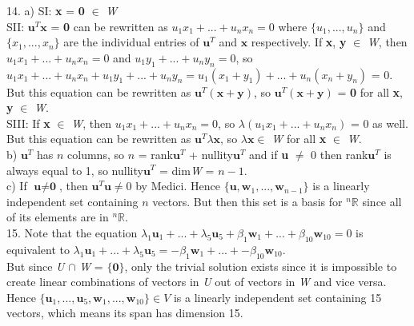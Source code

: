 \documentclass{article}
\begin{document}
    14. a) SI: \textbf{x} = \textbf{0} $\in$ \textit{W}\\
    SII: $\textbf{u}^T\textbf{x}$ = \textbf{0} can be rewritten as $\textit{u}_1\textit{x}_1 + ... + \textit{u}_n\textit{x}_n = 0$ where $\{\textit{u}_1, ..., \textit{u}_n\}$ and $\{\textit{x}_1, ..., \textit{x}_n\}$ are the individual entries of $\textbf{u}^T$ and $\textbf{x}$ respectively. If \textbf{x}, \textbf{y} $\in$ \textit{W}, then $\textit{u}_1\textit{x}_1 + ... + \textit{u}_n\textit{x}_n = 0$ and $\textit{u}_1\textit{y}_1 + ... + \textit{u}_n\textit{y}_n = 0$, so $\textit{u}_1\textit{x}_1 + ... + \textit{u}_n\textit{x}_n + \textit{u}_1\textit{y}_1 + ... + \textit{u}_n\textit{y}_n = \textit{u}_1(\textit{x}_1 +\textit{y}_1) + ... + \textit{u}_n(\textit{x}_n + \textit{y}_n)$ = 0. But this equation can be rewritten as $\textbf{u}^T(\textbf{x} + \textbf{y})$, so $\textbf{u}^T(\textbf{x} + \textbf{y})$ = \textbf{0} for all \textbf{x}, \textbf{y} $\in$ \textit{W}.\\
    SIII: If \textbf{x} $\in$ \textit{W}, then $\textit{u}_1\textit{x}_1 + ... + \textit{u}_n\textit{x}_n = 0$, so $\lambda(\textit{u}_1\textit{x}_1 + ... + \textit{u}_n\textit{x}_n)$ = 0 as well. But this equation can be rewritten as $\textbf{u}^T\lambda\textbf{x}$, so $\lambda\textbf{x} \in$ \textit{W} for all \textbf{x} $\in$ \textit{W}.\\
    b) $\textbf{u}^T$ has $n$ columns, so  $n$ = rank$\textbf{u}^T$ + nullity$\textbf{u}^T$ and if \textbf{u} $\neq$ 0 then rank$\textbf{u}^T$ is always equal to 1, so nullity$\textbf{u}^T$ = dim\textit{W} = $n - 1$.\\
    c) If $\textbf{u} \neq \textbf{0}$, then $\textbf{u}^T\textbf{u} \neq 0$ by Medici. Hence $\{\textbf{u}, \textbf{w}_1, ..., \textbf{w}_{n-1}\}$ is a linearly independent set containing $n$ vectors. But then this set is a basis for $^n\mathbb{R}$ since all of its elements are in $^n\mathbb{R}$.\\

    15. Note that the equation $\lambda_1\textbf{u}_1 + ... + \lambda_5\textbf{u}_5 + \beta_1\textbf{w}_1 + ... + \beta_10\textbf{w}_{10} = 0$ is equivalent to $\lambda_1\textbf{u}_1 + ... + \lambda_5\textbf{u}_5 = -\beta_1\textbf{w}_1 + ... + -\beta_{10}\textbf{w}_{10}$. \\ But since \textit{U} $\cap$ \textit{W} = $\{\textbf{0}\}$, only the trivial solution exists since it is impossible to create linear combinations of vectors in \textit{U} out of vectors in \textit{W} and vice versa. Hence $\{\textbf{u}_1, ..., \textbf{u}_5, \textbf{w}_1, ...,  \textbf{w}_{10}\} \in \textit{V}$ is a linearly independent set containing 15 vectors, which means its span has dimension 15.\\
\end{document}
